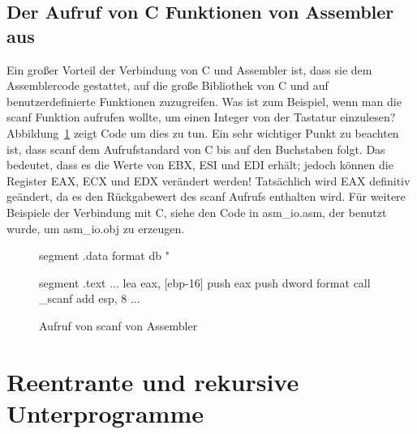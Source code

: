 \subsection{Der Aufruf von C Funktionen von Assembler aus}

Ein gro{\ss}er Vorteil der Verbindung von C und Assembler ist, dass sie
dem Assemblercode gestattet, auf die gro{\ss}e Bibliothek von C und auf
benutzerdefinierte Funktionen zuzugreifen. Was ist zum Beispiel,
wenn man die {\code scanf} Funktion aufrufen wollte, um einen
Integer von der Tastatur einzulesen? Abbildung~\ref{fig:scanf} zeigt
Code um dies zu tun. Ein sehr wichtiger Punkt zu beachten ist, dass
{\code scanf} dem Aufrufstandard von C bis auf den Buchstaben folgt.
Das bedeutet, dass es die Werte von EBX, ESI und EDI erh\"{a}lt; jedoch
k\"{o}nnen die Register EAX, ECX und EDX ver\"{a}ndert werden! Tats\"{a}chlich
wird EAX definitiv ge\"{a}ndert, da es den R\"{u}ckgabewert des {\code
scanf} Aufrufs enthalten wird. F\"{u}r weitere Beispiele der Verbindung
mit C, siehe den Code in {\code asm\_io.asm}, der benutzt wurde, um
{\code asm\_io.obj} zu erzeugen. 

\begin{figure}[ht]
\begin{AsmCodeListing}[frame=single, numbers=left]
 segment .data
 format       db "%

 segment .text
 ...
       lea    eax, [ebp-16]
       push   eax
       push   dword format
       call   _scanf
       add    esp, 8
 ...
\end{AsmCodeListing}
\caption{Aufruf von {\code scanf} von Assembler\label{fig:scanf}}
\end{figure}

\section{Reentrante und rekursive Unterprogramme}

